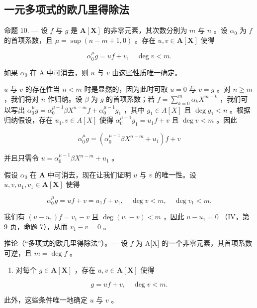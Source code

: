 \subsection{一元多项式的欧几里得除法}

命题 10. --- 设 \(f\) 与 \(g\) 是 \(\mathbf{A}[\mathbf{X}]\) 的非零元素，其次数分别为 \(m\) 与 \(n\) 。设 \(\alpha_0\) 为 \(f\) 的首项系数，且 \(\mu = \sup (n - m + 1, 0)\) 。存在 \(u, v \in \mathbf{A}[\mathbf{X}]\) 使得

\[
\alpha_ {0} ^ {\mu} g = u f + v, \quad \deg v <   m.
\]

如果 \(\alpha_0\) 在 A 中可消去，则 \(u\) 与 \(v\) 由这些性质唯一确定。

\(u\) 与 \(v\) 的存在性当 \(n < m\) 时是显然的，因为此时可取 \(u = 0\) 与 \(v = g\) 。对 \(n \geqslant m\) ，我们将对 \(n\) 作归纳。设 \(\beta\) 为 \(g\) 的首项系数；若 \(f = \sum_{k=0}^{m} \alpha_k X^{m-k}\) ，我们可以写出 \(\alpha_0^\mu g = \alpha_0^{\mu-1} \beta X^{n-m} f + \alpha_0^{\mu-1} g_1\) ，其中 \(g_1 \in A[X]\) 且 \(\deg g_1 < n\) 。根据归纳假设，存在 \(u_1, v \in A[X]\) 使得 \(\alpha_0^{\mu-1} g_1 = u_1 f + v\) 且 \(\deg v < m\) 。因此

\[
\alpha_ {0} ^ {\mu} g = \left(\alpha_ {0} ^ {\mu - 1} \beta X ^ {n - m} + u _ {1}\right) f + v
\]

并且只需令 \(u = \alpha_0^{\mu - 1}\beta X^{n - m} + u_1\) 。

假设 \(\alpha_0\) 在 \(\mathbf{A}\) 中可消去，现在让我们证明 \(u\) 与 \(v\) 的唯一性。设 \(u, v, u_1, v_1 \in \mathbf{A}[\mathbf{X}]\) 使得

\[
\alpha_ {0} ^ {\mu} g = u f + v = u _ {1} f + v _ {1}, \quad \deg v <   m, \quad \deg v _ {1} <   m.
\]

我们有 \((u - u_{1})f = v_{1} - v\) 且 \(\deg (v_1 - v) < m\) ，因此 \(u - u_{1} = 0\) （IV，第 9 页，命题 7），从而 \(v_{1} - v = 0\) 。

推论（“多项式的欧几里得除法”）。--- 设 \(f\) 为 A{[}X{]} 的一个非零元素，其首项系数可逆，且 \(m = \deg f\) 。

\begin{enumerate}
\def\labelenumi{(\roman{enumi})}
\tightlist
\item
  对每个 \(g \in \mathbf{A}[\mathbf{X}]\) ，存在 \(u, v \in \mathbf{A}[\mathbf{X}]\) 使得
\end{enumerate}

\[
g = u f + v, \quad \deg v <   m.
\]

此外，这些条件唯一地确定 \(u\) 与 \(v\) 。

